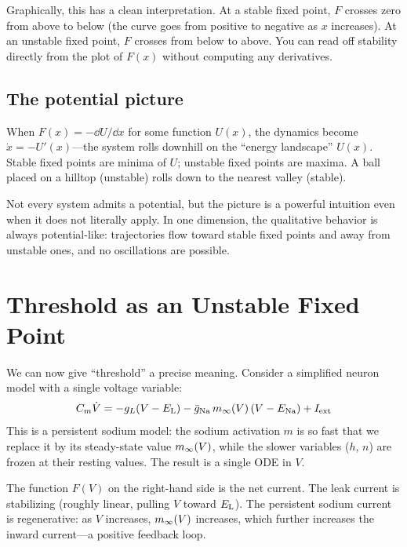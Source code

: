 Graphically, this has a clean interpretation. At a stable fixed point, $F$ crosses zero from above to below (the curve goes from positive to negative as $x$ increases). At an unstable fixed point, $F$ crosses from below to above. You can read off stability directly from the plot of $F(x)$ without computing any derivatives.

\subsection{The potential picture}

When $F(x) = -\dd U/\dd x$ for some function $U(x)$, the dynamics become $\dot{x} = -U'(x)$---the system rolls downhill on the ``energy landscape'' $U(x)$. Stable fixed points are minima of $U$; unstable fixed points are maxima. A ball placed on a hilltop (unstable) rolls down to the nearest valley (stable).

Not every system admits a potential, but the picture is a powerful intuition even when it does not literally apply. In one dimension, the qualitative behavior is always potential-like: trajectories flow toward stable fixed points and away from unstable ones, and no oscillations are possible.

\section{Threshold as an Unstable Fixed Point}
\label{sec:threshold-1d}

We can now give ``threshold'' a precise meaning. Consider a simplified neuron model with a single voltage variable:
%
\begin{equation}
  C_m\dot{V} = -g_L(V - E_{\mathrm{L}}) - \bar{g}_{\mathrm{Na}}\,m_\infty(V)\,(V - E_{\mathrm{Na}}) + I_{\text{ext}}
  \label{eq:persistent-na}
\end{equation}
%
This is a persistent sodium model: the sodium activation $m$ is so fast that we replace it by its steady-state value $m_\infty(V)$, while the slower variables ($h$, $n$) are frozen at their resting values. The result is a single ODE in $V$.

The function $F(V)$ on the right-hand side is the net current. The leak current is stabilizing (roughly linear, pulling $V$ toward $E_{\mathrm{L}}$). The persistent sodium current is regenerative: as $V$ increases, $m_\infty(V)$ increases, which further increases the inward current---a positive feedback loop.


